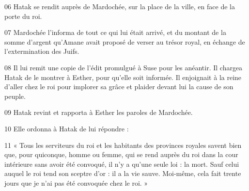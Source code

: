 
06 Hatak se rendit auprès de Mardochée, sur la place de la ville, en face de la porte du roi.

07 Mardochée l’informa de tout ce qui lui était arrivé, et du montant de la somme d’argent qu’Amane avait proposé de verser au trésor royal, en échange de l’extermination des Juifs.

08 Il lui remit une copie de l’édit promulgué à Suse pour les anéantir. Il chargea Hatak de le montrer à Esther, pour qu’elle soit informée. Il enjoignait à la reine d’aller chez le roi pour implorer sa grâce et plaider devant lui la cause de son peuple.

09 Hatak revint et rapporta à Esther les paroles de Mardochée.

10 Elle ordonna à Hatak de lui répondre :

11 « Tous les serviteurs du roi et les habitants des provinces royales savent bien que, pour quiconque, homme ou femme, qui se rend auprès du roi dans la cour intérieure sans avoir été convoqué, il n’y a qu’une seule loi : la mort. Sauf celui auquel le roi tend son sceptre d’or : il a la vie sauve. Moi-même, cela fait trente jours que je n’ai pas été convoquée chez le roi. »
